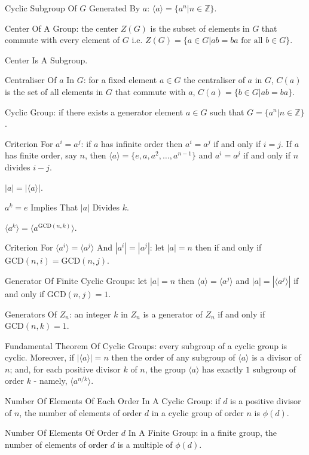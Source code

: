 Cyclic Subgroup Of $G$ Generated By $a$: $\langle a \rangle = \{ a^n | n \in \mathbb{Z} \}$.

Center Of A Group: the center $Z(G)$ is the subset of elements in $G$ that commute with every element of $G$ i.e. $Z(G) = \{ a \in G | ab=ba \text{ for all } b \in G \}$.

Center Is A Subgroup.

Centraliser Of $a$ In $G$: for a fixed element $a \in G$ the centraliser of $a$ in $G$, $C(a)$ is the set of all elements in $G$ that commute with $a$, $C(a) = \{ b \in G | ab=ba \}$.

Cyclic Group: if there exists a generator element $a \in G$ such that $G = \{ a^n | n \in \mathbb{Z} \}$.

Criterion For $a^i = a^j$: if $a$ has infinite order then $a^i=a^j$ if and only if $i=j$. If $a$ has finite order, say $n$, then $\langle a \rangle = \{ e,a,a^2,\dots,a^{n-1} \}$ and $a^i = a^j$ if and only if $n$ divides $i-j$.

$|a|=| \langle a \rangle |$.

$a^k=e$ Implies That $|a|$ Divides $k$.

$\langle a^k \rangle = \langle a^{\text{GCD}(n,k)} \rangle$.

Criterion For $\langle a^i \rangle = \langle a^j \rangle$ And $|a^i|=|a^j|$: let $|a| = n$ then if and only if $\text{GCD}(n,i) = \text{GCD}(n,j)$.

Generator Of Finite Cyclic Groups: let $|a| = n$ then $\langle a \rangle = \langle a^j \rangle$ and $|a|=| \langle a^j \rangle |$ if and only if $\text{GCD}(n,j)=1$.

Generators Of $Z_n$: an integer $k$ in $Z_n$ is a generator of $Z_n$ if and only if $\text{GCD}(n,k) = 1$.

Fundamental Theorem Of Cyclic Groups: every subgroup of a cyclic group is cyclic. Moreover, if $| \langle a \rangle |=n$ then the order of any subgroup of $\langle a \rangle$ is a divisor of $n$; and, for each positive divisor $k$ of $n$, the group $\langle a \rangle$ has exactly $1$ subgroup of order $k$ - namely, $\langle a^{n/k} \rangle$.

Number Of Elements Of Each Order In A Cyclic Group: if $d$ is a positive divisor of $n$, the number of elements of order $d$ in a cyclic group of order $n$ is $\phi (d)$.

Number Of Elements Of Order $d$ In A Finite Group: in a finite group, the number of elements of order $d$ is a multiple of $\phi (d)$.

